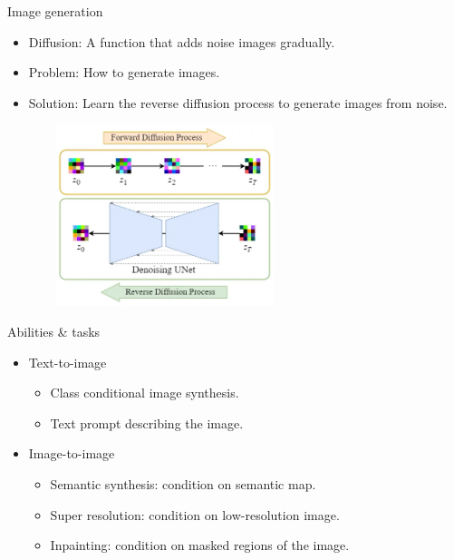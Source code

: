 \documentclass[8pt]{beamer}
\begin{document}
\begin{frame}{Image generation}
    \begin{itemize}
        \item Diffusion: A function that adds noise images gradually.
        \item Problem: How to generate images.
        \item Solution: Learn the reverse diffusion process to generate images from noise.
    \end{itemize}
   \begin{figure}
       \centering
       \includegraphics[width=200pt, height=150pt]{images/forward_backward_pass.png}
       \label{fig:NN_training}
   \end{figure} 
   \cite{steins}
\end{frame}


\begin{frame}{Abilities \& tasks}
    \begin{itemize}
        \item Text-to-image
        \begin{itemize}
            \item Class conditional image synthesis.
            \item Text prompt describing the image.
        \end{itemize}
        \item Image-to-image
        \begin{itemize}
            \item Semantic synthesis: condition on semantic map.
            \item Super resolution: condition on low-resolution image.
            \item Inpainting: condition on masked regions of the image.
        \end{itemize}
    \end{itemize}
\end{frame}
\end{document}

